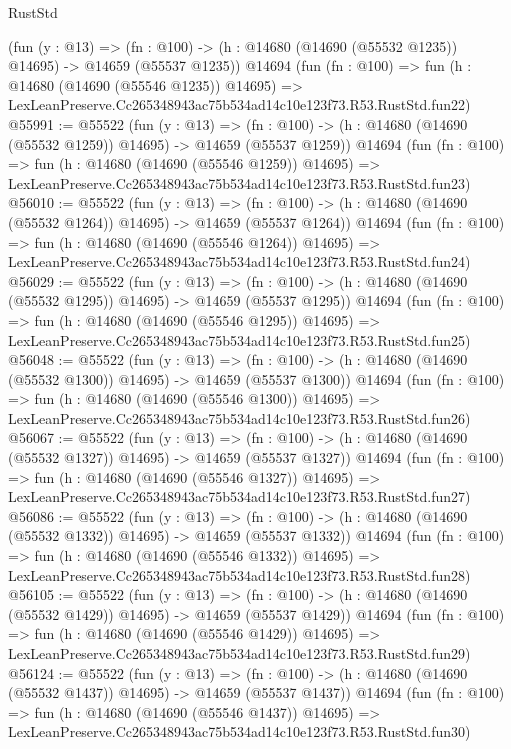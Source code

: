 \begin{lexlean}{RustStd}
\begin{coremodule}
    (fun (y : @13) =>
    (fn : @100) -> (h : @14680 (@14690 (@55532 @1235)) @14695) -> @14659 (@55537 @1235))
    @14694
    (fun (fn : @100) =>
    fun (h : @14680 (@14690 (@55546 @1235)) @14695) =>
    LexLeanPreserve.Cc265348943ac75b534ad14c10e123f73.R53.RustStd.fun22)
@55991 := @55522
    (fun (y : @13) =>
    (fn : @100) -> (h : @14680 (@14690 (@55532 @1259)) @14695) -> @14659 (@55537 @1259))
    @14694
    (fun (fn : @100) =>
    fun (h : @14680 (@14690 (@55546 @1259)) @14695) =>
    LexLeanPreserve.Cc265348943ac75b534ad14c10e123f73.R53.RustStd.fun23)
@56010 := @55522
    (fun (y : @13) =>
    (fn : @100) -> (h : @14680 (@14690 (@55532 @1264)) @14695) -> @14659 (@55537 @1264))
    @14694
    (fun (fn : @100) =>
    fun (h : @14680 (@14690 (@55546 @1264)) @14695) =>
    LexLeanPreserve.Cc265348943ac75b534ad14c10e123f73.R53.RustStd.fun24)
@56029 := @55522
    (fun (y : @13) =>
    (fn : @100) -> (h : @14680 (@14690 (@55532 @1295)) @14695) -> @14659 (@55537 @1295))
    @14694
    (fun (fn : @100) =>
    fun (h : @14680 (@14690 (@55546 @1295)) @14695) =>
    LexLeanPreserve.Cc265348943ac75b534ad14c10e123f73.R53.RustStd.fun25)
@56048 := @55522
    (fun (y : @13) =>
    (fn : @100) -> (h : @14680 (@14690 (@55532 @1300)) @14695) -> @14659 (@55537 @1300))
    @14694
    (fun (fn : @100) =>
    fun (h : @14680 (@14690 (@55546 @1300)) @14695) =>
    LexLeanPreserve.Cc265348943ac75b534ad14c10e123f73.R53.RustStd.fun26)
@56067 := @55522
    (fun (y : @13) =>
    (fn : @100) -> (h : @14680 (@14690 (@55532 @1327)) @14695) -> @14659 (@55537 @1327))
    @14694
    (fun (fn : @100) =>
    fun (h : @14680 (@14690 (@55546 @1327)) @14695) =>
    LexLeanPreserve.Cc265348943ac75b534ad14c10e123f73.R53.RustStd.fun27)
@56086 := @55522
    (fun (y : @13) =>
    (fn : @100) -> (h : @14680 (@14690 (@55532 @1332)) @14695) -> @14659 (@55537 @1332))
    @14694
    (fun (fn : @100) =>
    fun (h : @14680 (@14690 (@55546 @1332)) @14695) =>
    LexLeanPreserve.Cc265348943ac75b534ad14c10e123f73.R53.RustStd.fun28)
@56105 := @55522
    (fun (y : @13) =>
    (fn : @100) -> (h : @14680 (@14690 (@55532 @1429)) @14695) -> @14659 (@55537 @1429))
    @14694
    (fun (fn : @100) =>
    fun (h : @14680 (@14690 (@55546 @1429)) @14695) =>
    LexLeanPreserve.Cc265348943ac75b534ad14c10e123f73.R53.RustStd.fun29)
@56124 := @55522
    (fun (y : @13) =>
    (fn : @100) -> (h : @14680 (@14690 (@55532 @1437)) @14695) -> @14659 (@55537 @1437))
    @14694
    (fun (fn : @100) =>
    fun (h : @14680 (@14690 (@55546 @1437)) @14695) =>
    LexLeanPreserve.Cc265348943ac75b534ad14c10e123f73.R53.RustStd.fun30)

\end{coremodule}
\end{lexlean}
